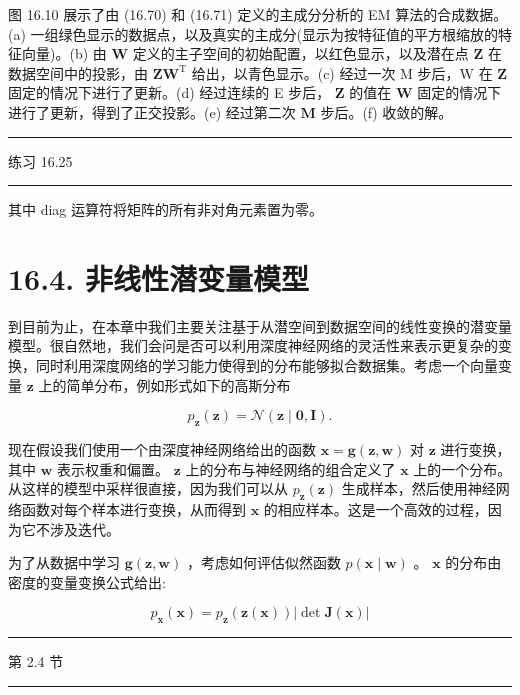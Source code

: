 \documentclass[10pt]{article}
\newcommand{\HRule}{\begin{center}\rule{0.9\linewidth}{0.2mm}\end{center}}
\begin{document}
图 16.10 展示了由 (16.70) 和 (16.71) 定义的主成分分析的 EM 算法的合成数据。(a) 一组绿色显示的数据点，以及真实的主成分(显示为按特征值的平方根缩放的特征向量)。(b) 由 \(\mathbf{W}\) 定义的主子空间的初始配置，以红色显示，以及潜在点 \(\mathbf{Z}\) 在数据空间中的投影，由 \(\mathbf{Z}{\mathbf{W}}^{\mathrm{T}}\) 给出，以青色显示。(c) 经过一次 M 步后，W 在 \(\mathbf{Z}\) 固定的情况下进行了更新。(d) 经过连续的 E 步后， \(\mathbf{Z}\) 的值在 \(\mathbf{W}\) 固定的情况下进行了更新，得到了正交投影。(e) 经过第二次 \(\mathbf{M}\) 步后。(f) 收敛的解。

\HRule

练习 16.25

\HRule

其中 diag 运算符将矩阵的所有非对角元素置为零。

\section*{16.4. 非线性潜变量模型}

到目前为止，在本章中我们主要关注基于从潜空间到数据空间的线性变换的潜变量模型。很自然地，我们会问是否可以利用深度神经网络的灵活性来表示更复杂的变换，同时利用深度网络的学习能力使得到的分布能够拟合数据集。考虑一个向量变量 \(\mathbf{z}\) 上的简单分布，例如形式如下的高斯分布

\[
{p}_{\mathbf{z}}\left( \mathbf{z}\right)  = \mathcal{N}\left( {\mathbf{z} \mid  \mathbf{0},\mathbf{I}}\right) . \tag{16.77}
\]

现在假设我们使用一个由深度神经网络给出的函数 \(\mathbf{x} = \mathbf{g}\left( {\mathbf{z},\mathbf{w}}\right)\) 对 \(\mathbf{z}\) 进行变换，其中 \(\mathbf{w}\) 表示权重和偏置。 \(\mathbf{z}\) 上的分布与神经网络的组合定义了 \(\mathbf{x}\) 上的一个分布。从这样的模型中采样很直接，因为我们可以从 \({p}_{\mathbf{z}}\left( \mathbf{z}\right)\) 生成样本，然后使用神经网络函数对每个样本进行变换，从而得到 \(\mathbf{x}\) 的相应样本。这是一个高效的过程，因为它不涉及迭代。

为了从数据中学习 \(\mathbf{g}\left( {\mathbf{z},\mathbf{w}}\right)\) ，考虑如何评估似然函数 \(p\left( {\mathbf{x} \mid  \mathbf{w}}\right)\) 。 \(\mathbf{x}\) 的分布由密度的变量变换公式给出:

\[
{p}_{\mathbf{x}}\left( \mathbf{x}\right)  = {p}_{\mathbf{z}}\left( {\mathbf{z}\left( \mathbf{x}\right) }\right) \left| {\det \mathbf{J}\left( \mathbf{x}\right) }\right|  \tag{16.78}
\]

\HRule

第 2.4 节

\HRule
\end{document}
